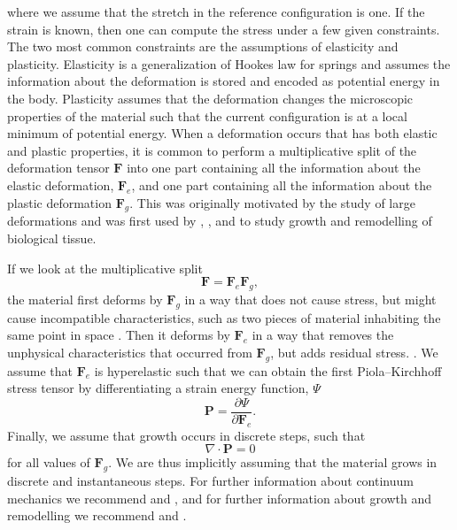 where we assume that the stretch in the reference configuration is one. If the strain is known, then one can compute the stress under a few given constraints. The two most common constraints are the assumptions of elasticity and plasticity. Elasticity is a generalization of Hookes law for springs and assumes the information about the deformation is stored and encoded as potential energy in the body. Plasticity assumes that the deformation changes the microscopic properties of the material such that the current configuration is at a local minimum of potential energy. When a deformation occurs that has both elastic and plastic properties, it is common to perform a multiplicative split of the deformation tensor $\mathbf{F}$ into one part containing all the information about the elastic deformation, $\mathbf{F}_e$, and one part containing all the information about the plastic deformation $\mathbf{F}_g$. This was originally motivated by the study of large deformations and was first used by \citep{Kondaurov1987}, \citep{Takamizawa1990}, and \citep{Rodriguez1994} to study growth and remodelling of biological tissue. \par 
If we look at the multiplicative split
\begin{equation*}
    \mathbf{F} = \mathbf{F}_e\mathbf{F}_g,
\end{equation*}
the material first deforms by $\mathbf{F}_g$ in a way that does not cause stress, but might cause incompatible characteristics, such as two pieces of material inhabiting the same point in space . Then it deforms by $\mathbf{F}_e$ in a way that removes the unphysical characteristics that occurred from $\mathbf{F}_g$, but adds residual stress. . We assume that $\mathbf{F}_e$ is hyperelastic such that we can obtain the first Piola–Kirchhoff stress tensor by differentiating a strain energy function, $\Psi$
\begin{equation*}
    \mathbf{P} = \frac{\partial\Psi}{\partial \mathbf{F}_e}.
\end{equation*}
Finally, we assume that growth occurs in discrete steps, such that 
\begin{equation*}
    \nabla\cdot\mathbf{P} = 0
\end{equation*}
for all values of $\mathbf{F}_g$. We are thus implicitly assuming that the material grows in discrete and instantaneous steps. For further information about continuum mechanics we recommend \citep{Marsden1983} and \citep{Holzapfel2002}, and for further information about growth and remodelling we recommend \citep{Goriely2017} and \citep{Yavari2010}.
